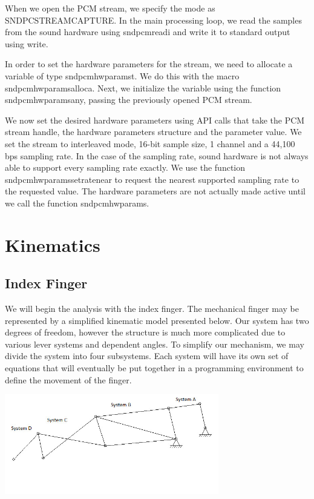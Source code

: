 \documentclass{article}
\begin{document}
When we open the PCM stream, we specify the mode as SND\textunderscore PC\textunderscore STREAM\textunderscore CAPTURE. In the main processing loop, we read the samples from the sound hardware using snd\textunderscore pcm\textunderscore readi and write it to standard output using write. 

In order to set the hardware parameters for the stream, we need to allocate a variable of type snd\textunderscore pcm\textunderscore hw\textunderscore params\textunderscore t. We do this with the macro snd\textunderscore pcm\textunderscore hw\textunderscore params\textunderscore alloca. Next, we initialize the variable using the function snd\textunderscore pcm\textunderscore hw\textunderscore params\textunderscore any, passing the previously opened PCM stream. 

We now set the desired hardware parameters using API calls that take the PCM stream handle, the hardware parameters structure and the parameter value. We set the stream to interleaved mode, 16-bit sample size, 1 channel and a 44,100 bps sampling rate. In the case of the sampling rate, sound hardware is not always able to support every sampling rate exactly. We use the function snd\textunderscore pcm\textunderscore hw\textunderscore params\textunderscore set\textunderscore rate\textunderscore near to request the nearest supported sampling rate to the requested value. The hardware parameters are not actually made active until we call the function snd\textunderscore pcm\textunderscore hw\textunderscore params.

\section{Kinematics}
\subsection{Index Finger}
We will begin the analysis with the index finger. The mechanical finger may be represented by a simplified kinematic model presented below. Our system has two degrees of freedom, however the structure is much more complicated due to various lever systems and dependent angles. To simplify our mechanism, we may divide the system into four subsystems. Each system will have its own set of equations that will eventually be put together in a programming environment to define the movement of the finger.

\begin{center}
\includegraphics[width=0.7\textwidth]{IMG/IK_01.jpeg}
\end{center}
\end{document}
